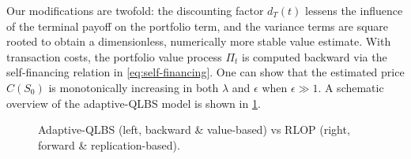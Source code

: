 
Our modifications are twofold:
the discounting factor $d_T(t)$ lessens the influence of the terminal payoff on the portfolio term,
and the variance terms are square rooted to obtain a dimensionless, numerically more stable value estimate.
With transaction costs, the portfolio value process $\Pi_t$ is computed backward via the self-financing relation in \cref{eq:self-financing}.
One can show that the estimated price $C(S_0)$ is monotonically increasing in both $\lambda$ and $\epsilon$ when $\epsilon\gg 1$.
A schematic overview of the adaptive-QLBS model is shown in \cref{fig:qlbs-illustration}.


\begin{figure}[htbp]
    \begin{minipage}{0.35\textwidth}
        \centering
        
        
        \label{fig:qlbs-illustration}
    \end{minipage}
    \hspace{0.02\textwidth}
    \begin{minipage}{0.62\textwidth}
        \centering
        
    \end{minipage}
    
    \caption{Adaptive-QLBS (left, backward \& value-based) vs RLOP (right, forward \& replication-based).}

\end{figure}


